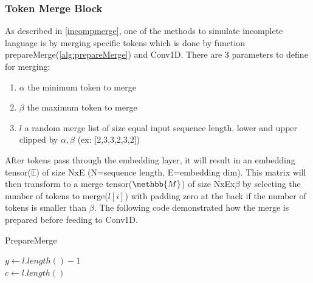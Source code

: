 \documentclass[12pt]{article}
\begin{document}
\subsubsection{Token Merge Block} \label{modelMerge}
As described in \ref{incompmerge}, one of the methods to simulate incomplete language is by merging specific tokens which is done by function prepareMerge(\ref{alg:prepareMerge}) and Conv1D. There are 3 parameters to define for merging: 
\begin{enumerate}
    \item $\alpha$ the minimum token to merge 
    \item $\beta$ the maximum token to merge
    \item $l$ a random merge list of size equal input sequence length, lower and upper clipped by $\alpha,\beta$ (ex: [2,3,3,2,3,2]) 
\end{enumerate}

After tokens pass through the embedding layer, it will result in an embedding tensor($\mathbb{E}$) of size NxE (N=sequence length, E=embedding dim). This matrix will then transform to a merge tensor($\methbb{M}$) of size NxEx$\beta$ by selecting the number of tokens to merge($l[i]$) with padding zero at the back if the number of tokens is smaller than $\beta$. The following code demonstrated how the merge is prepared before feeding to Conv1D.

\begin{algorithm}
\fontsize{7pt}{7pt}\selectfont
\caption{PrepareMerge}\label{alg:prepareMerge}
\begin{algorithmic}

$y \gets l.length()-1$\\
$c \gets l.length()$\\
\end{algorithmic}
\end{algorithm}
\end{document}
